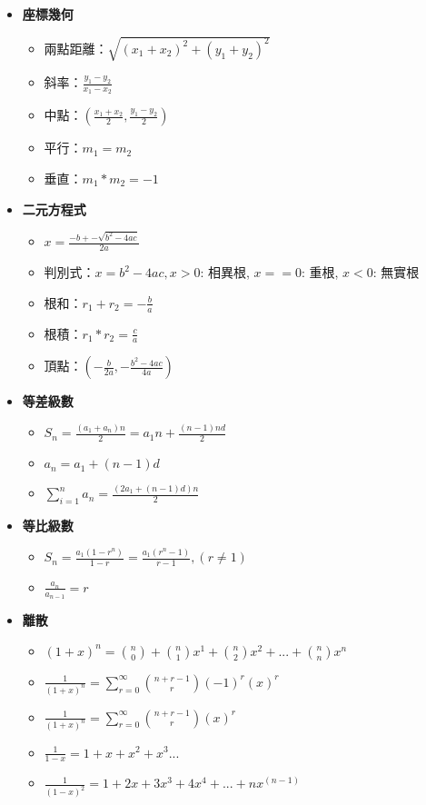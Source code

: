 \begin{itemize}
\begin{itemize}
  \end{itemize}

  \item \textbf{座標幾何}
  \begin{itemize}
    \item 兩點距離：$\sqrt{(x_1+x_2)^2+(y_1+y_2)^2}$
    \item 斜率：$\frac{y_1-y_2}{x_1-x_2}$
    \item 中點：$(\frac{x_1+x_2}{2}, \frac{y_1-y_2}{2})$
    \item 平行：$m_1 = m_2$
    \item 垂直：$m_1*m_2 = -1$
  \end{itemize}

  \item \textbf{二元方程式}
  \begin{itemize}
    \item $x = \frac{-b +- \sqrt{b^2-4ac}}{2a}$
    \item 判別式：$x = b^2-4ac, x>0$: 相異根, $x==0$: 重根, $x<0$: 無實根
    \item 根和：$r_1+r_2 = -\frac{b}{a}$
    \item 根積：$r_1*r_2 = \frac{c}{a}$
    \item 頂點：$(-\frac{b}{2a}, -\frac{b^2-4ac}{4a})$
  \end{itemize}
  
  \item \textbf{等差級數}
  \begin{itemize}
    \item $S_n = \frac{(a_1 + a_n)n}{2} = a_1n + \frac{(n-1)nd}{2}$
    \item $a_n = a_1 + (n-1)d$
    \item $\sum \limits_{i=1}^n a_n = \frac{(2a_1+(n-1)d)n}{2}$
  \end{itemize}
  
  \item \textbf{等比級數}
  \begin{itemize}
    \item $S_n = \frac{a_1(1-r^n)}{1-r} = \frac{a_1(r^n-1)}{r-1}, (r \neq 1)$
    \item $\frac{a_n}{a_{n-1}} = r$
  \end{itemize}

  \item \textbf{離散}
  \begin{itemize}
    \item $(1+x)^n = \binom{n}{0} + \binom{n}{1}x^1 + \binom{n}{2}x^2 + ... + \binom{n}{n}x^n$
    \item $\frac{1}{(1+x)^n} = \sum \limits_{r=0}^\infty \binom{n+r-1}{r}(-1)^r(x)^r$
    \item $\frac{1}{(1+x)^n} = \sum \limits_{r=0}^\infty \binom{n+r-1}{r}(x)^r$
    \item $\frac{1}{1-x} = 1+x+x^2+x^3...$
    \item $\frac{1}{(1-x)^2} = 1+2x+3x^3+4x^4+...+nx^(n-1)$
  \end{itemize}


\end{itemize}

